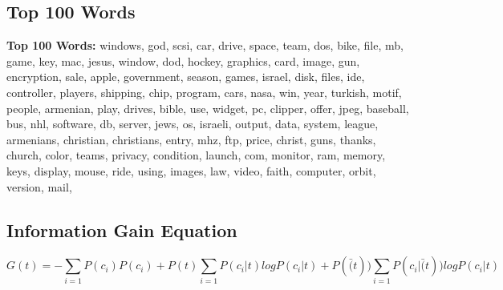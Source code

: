 \documentclass{IEEEtran}
\begin{document}
\subsection{Top 100 Words}
\textbf{Top 100 Words:}
  windows,
  god,
  scsi,
  car,
  drive,
  space,
  team,
  dos,
  bike,
  file,
  mb,
  game,
  key,
  mac,
  jesus,
  window,
  dod,
  hockey,
  graphics,
  card,
  image,
  gun,
  encryption,
  sale,
  apple,
  government,
  season,
  games,
  israel,
  disk,
  files,
  ide,
  controller,
  players,
  shipping,
  chip,
  program,
  cars,
  nasa,
  win,
  year,
  turkish,
  motif,
  people,
  armenian,
  play,
  drives,
  bible,
  use,
  widget,
  pc,
  clipper,
  offer,
  jpeg,
  baseball,
  bus,
  nhl,
  software,
  db,
  server,
  jews,
  os,
  israeli,
  output,
  data,
  system,
  league,
  armenians,
  christian,
  christians,
  entry,
  mhz,
  ftp,
  price,
  christ,
  guns,
  thanks,
  church,
  color,
  teams,
  privacy,
  condition,
  launch,
  com,
  monitor,
  ram,
  memory,
  keys,
  display,
  mouse,
  ride,
  using,
  images,
  law,
  video,
  faith,
  computer,
  orbit,
  version,
  mail,

\subsection{Information Gain Equation}
\begin{equation}
\label{eq:infogain}
G(t) = -\sum_{i=1}P(c_i)P(c_i)
+ P(t)\sum_{i=1}P(c_i|t)log P(c_i|t)
+ P(\bar(t))\sum_{i=1}P(c_i|\bar(t))log P(c_i|t)
\end{equation}
\end{document}
